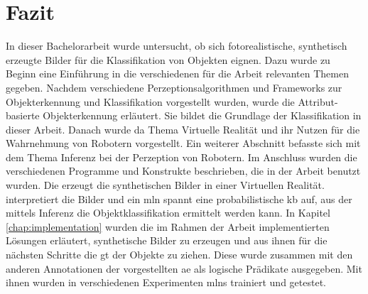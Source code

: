 \graphicspath{{./images/}}      
\def\CHAPTERONE{./chapters/Chapter-1} 

\chapter{Fazit}
\label{chap:fazit}
%	

In dieser Bachelorarbeit wurde untersucht, ob sich fotorealistische, synthetisch erzeugte Bilder für die Klassifikation von Objekten eignen. Dazu wurde zu Beginn eine Einführung in die verschiedenen für die Arbeit relevanten Themen gegeben. Nachdem verschiedene Perzeptionsalgorithmen und Frameworks zur Objekterkennung und Klassifikation vorgestellt wurden, wurde die Attribut-basierte Objekterkennung erläutert. Sie bildet die Grundlage der Klassifikation in dieser Arbeit. Danach wurde da Thema Virtuelle Realität und ihr Nutzen für die Wahrnehmung von Robotern vorgestellt. Ein weiterer Abschnitt befasste sich mit dem Thema Inferenz bei der Perzeption von Robotern. Im Anschluss wurden die verschiedenen Programme und Konstrukte beschrieben, die in der Arbeit benutzt wurden. Die \unreal erzeugt die synthetischen Bilder in einer Virtuellen Realität. \robosherlock interpretiert die Bilder und ein \gls{mln} spannt eine probabilistische \gls{kb} auf, aus der mittels Inferenz die Objektklassifikation ermittelt werden kann. In Kapitel \ref{chap:implementation} wurden die im Rahmen der Arbeit implementierten Lösungen erläutert, synthetische Bilder zu erzeugen und aus ihnen für die nächsten Schritte die \gls{gt} der Objekte zu ziehen. Diese wurde zusammen mit den anderen Annotationen der vorgestellten \gls{ae} als logische Prädikate ausgegeben. Mit ihnen wurden in verschiedenen Experimenten \glspl{mln} trainiert und getestet. \par

